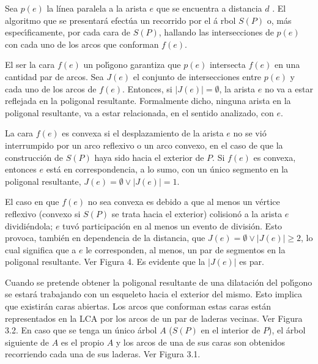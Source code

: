 \documentclass[12pt,english]{report}
\begin{document}
Sea $p(e)$ la l\'inea paralela a la arista $e$ que se encuentra a distancia $d$%
. El algoritmo que se presentar\'{a} efect\'{u}a un recorrido por el \'{a}%
rbol $S(P)$ o, m\'{a}s espec\'{\i}ficamente, por cada cara de $S(P)$, hallando las intersecciones de $p(e)$ con cada uno de los arcos que conforman $f(e)$. 

El ser la cara $f(e)$ un pol\'{\i}gono garantiza que $p(e)$ intersecta $f(e)$ en una cantidad par de arcos. Sea $J(e)$ el conjunto de intersecciones
entre $p(e)$ y cada uno de los arcos de $f(e)$. Entonces, si $|J(e)| = \emptyset$, la
arista $e$ no va a estar reflejada en la poligonal resultante. Formalmente dicho,
ninguna arista en la poligonal resultante, va a estar relacionada, en el sentido analizado, con $e$.

La cara $f(e)$ es convexa si el desplazamiento de la arista $e$ no se vi\'o interrumpido por un arco reflexivo o un arco convexo, en el caso de que la construcci\'on de $S(P)$ haya sido hacia el exterior de $P$. Si $f(e)$ es convexa, entonces $e$ est\'a en correspondencia, a lo sumo, con un \'{u}nico segmento en la poligonal resultante, $J(e)=\emptyset \vee \left|J(e)\right|=1$.

El caso en que $f(e)$ no sea convexa es debido a que al menos un v\'{e}rtice
reflexivo (convexo si $S(P)$ se trata hacia el exterior) colision\'{o} a la
arista $e$ dividi\'{e}ndola; $e$ tuv\'{o} participaci\'{o}n en al
menos un evento de divisi\'{o}n. Esto provoca, tambi\'{e}n en dependencia de
la distancia, que $J(e) = \emptyset \vee \left| J(e) \right| \geq 2$, lo cual significa que a $e$ le
corresponden, al menos, un par de segmentos en la poligonal resultante. Ver
Figura 4. Es evidente que la $\left| J(e) \right|$ es par.

Cuando se pretende obtener la poligonal resultante de una dilataci\'{o}n del
pol\'{\i}gono se estar\'{a} trabajando con un esqueleto hacia el exterior
del mismo. Esto implica que existir\'{a}n caras abiertas. Los arcos que
conforman estas caras est\'{a}n representados en la LCA por los arcos de
un par de laderas vecinas. Ver Figura 3.2.  En caso que se tenga un \'{u}nico 
\'{a}rbol $A$ ($S(P)$ en el interior de $P$), el \'{a}rbol siguiente de $A$
es el propio $A$ y los arcos de una de sus caras son obtenidos recorriendo
cada una de sus laderas. Ver Figura 3.1.
\end{document}
